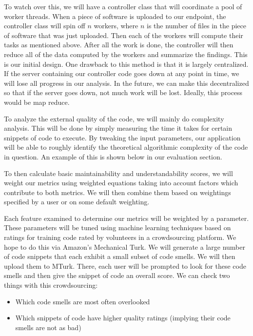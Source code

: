 \documentclass{sig-alternate}
\begin{document}
To watch over this, we will have a controller class that will coordinate a pool of worker threads. When a piece of software is uploaded to our endpoint, the controller class will spin off $n$ workers, where $n$ is the number of files in the piece of software that was just uploaded. Then each of the workers will compute their tasks as mentioned above. After all the work is done, the controller will then reduce all of the data computed by the workers and summarize the findings. This is our initial design. One drawback to this method is that it is largely centralized. If the server containing our controller code goes down at any point in time, we will lose all progress in our analysis. In the future, we can make this decentralized so that if the server goes down, not much work will be lost. Ideally, this process would be map reduce.

To analyze the external quality of the code, we will mainly do complexity analysis. This will be done by simply measuring the time it takes for certain snippets of code to execute. By tweaking the input parameters, our application will be able to roughly identify the theoretical algorithmic complexity of the code in question. An example of this is shown below in our evaluation section.

To then calculate basic maintainability and understandability scores, we will weight our metrics using weighted equations taking into account factors which contribute to both metrics. We will then combine them based on weightings specified by a user or on some default weighting.

Each feature examined to determine our metrics will be weighted by a parameter. These parameters will be tuned using machine learning techniques based on ratings for training code rated by volunteers in a crowdsourcing platform. We hope to do this via Amazon's Mechanical Turk. We will generate a large number of code snippets that each exhibit a small subset of code smells. We will then upload them to MTurk. There, each user will be prompted to look for these code smells and then give the snippet of code an overall score. We can check two things with this crowdsourcing:

\begin{itemize}
\item Which code smells are most often overlooked
\item Which snippets of code have higher quality ratings (implying their code smells are not as bad)
\end{itemize}
\end{document}
